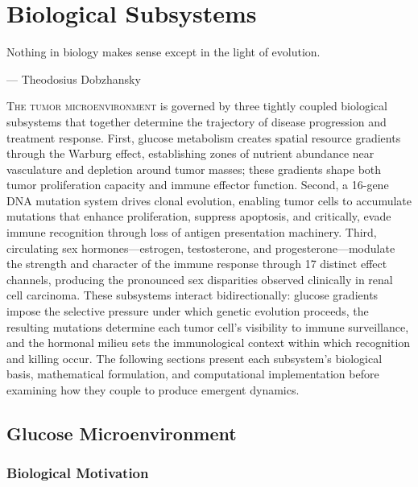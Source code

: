 \chapter{Biological Subsystems}
\label{ch:biological-subsystems}

\epigraph{Nothing in biology makes sense except in the light of evolution.}{--- Theodosius Dobzhansky}

\lettrine[lines=2]{T}{he tumor microenvironment} is governed by three tightly coupled biological subsystems that together determine the trajectory of disease progression and treatment response. First, glucose metabolism creates spatial resource gradients through the Warburg effect, establishing zones of nutrient abundance near vasculature and depletion around tumor masses; these gradients shape both tumor proliferation capacity and immune effector function. Second, a 16-gene DNA mutation system drives clonal evolution, enabling tumor cells to accumulate mutations that enhance proliferation, suppress apoptosis, and critically, evade immune recognition through loss of antigen presentation machinery. Third, circulating sex hormones---estrogen, testosterone, and progesterone---modulate the strength and character of the immune response through 17 distinct effect channels, producing the pronounced sex disparities observed clinically in renal cell carcinoma. These subsystems interact bidirectionally: glucose gradients impose the selective pressure under which genetic evolution proceeds, the resulting mutations determine each tumor cell's visibility to immune surveillance, and the hormonal milieu sets the immunological context within which recognition and killing occur. The following sections present each subsystem's biological basis, mathematical formulation, and computational implementation before examining how they couple to produce emergent dynamics.

\section{Glucose Microenvironment}
\label{sec:glucose-microenvironment}

\subsection{Biological Motivation}
\label{sec:glucose-bio}

